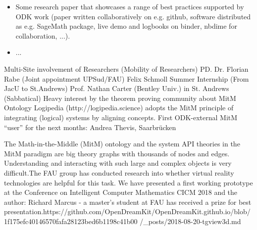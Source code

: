 \begin{Aim 1}
\begin{Aim 2}
\begin{itemize}
         OpenDreamKit member, Tania Allard, ran a hands-on workshop on Jupyter notebooks for reproducible research. This workshop focused on 
         the use of Jupyter notebooks as a means to disseminate reproducible analysis workflows and how this can be leveraged using tools 
         such as nbdime and nbval. Both nbdime and nbval were developed by members of the OpenDreamKit project as a response to the growing 
         popularity of the Jupyter notebooks and the lack of native integration between these technologies and existing version control and 
         validation/testing tools.
         An exceptional win was that this workshop was, in fact, one of the most popular events of the conference and we were asked to run 
         it twice as it was massively oversubscribed. This reflects, on one hand, the popularity of Jupyter notebooks due to the boom of 
         literate programming and its focus on human-readable code. Allowing researchers to share their findings and the code they used 
         along the way in a compelling narrative. On the other hand, it demonstrates the importance of reproducible science and the need for 
         tools that help RSE and researchers to achieve this goal, which aligns perfectly with the goals of OpenDreamKit.
         https://github.com/OpenDreamKit/OpenDreamKit.github.io/blob/6faf6eb2f1532f342f86c8da633078067ca40c85/_posts/2018-03-07-
         opendreamkit-at-the-rse-conference.md

 
\item Some research paper that showcases a range of best practices supported by ODK work (paper written collaboratively on e.g. github,
  software distributed as e.g. SageMath package, live demo and logbooks on binder, nbdime for collaboration, ...).\item ...\end{itemize}


Multi-Site involvement of Researchers (Mobility of Researchers)
PD. Dr. Florian Rabe (Joint appointment UPSud/FAU)
Felix Schmoll Summer Internship (From JacU to St.Andrews)
Prof. Nathan Carter (Bentley Univ.) in St. Andrews (Sabbatical)
Heavy interest by the theorem proving community about MitM Ontology
Logipedia (http://logipedia.science) adopts the MitM principle of integrating (logical) systems by aligning concepts.
First ODK-external MitM “user” for the next months: Andrea Thevis, Saarbrücken 


The Math-in-the-Middle (MitM) ontology and the system API theories in the MitM paradigm are big theory graphs with thousands of 
nodes and edges. Understanding and interacting with such large and complex objects is very difficult.The FAU group has conducted
research into whether virtual reality technologies are helpful for this task. We have presented a first working prototype at the
Conference on Intelligent Computer Mathematics CICM 2018 and the author: Richard Marcus - a master's student at FAU has received a
prize for best presentation.https://github.com/OpenDreamKit/OpenDreamKit.github.io/blob/1f175efc40146570fafa28123bed6b1198c41b00
/_posts/2018-08-20-tgview3d.md



\end{Aim 2}
\end{Aim 1}
